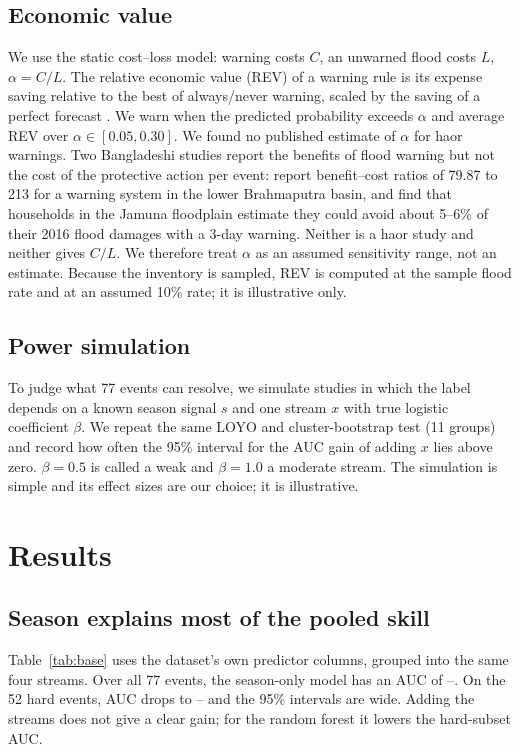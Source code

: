\subsection{Economic value}
We use the static cost--loss model: warning costs $C$, an unwarned flood costs $L$, $\alpha=C/L$. The relative economic value (REV) of a warning rule is its expense saving relative to the best of always/never warning, scaled by the saving of a perfect forecast \cite{richardson2000}. We warn when the predicted probability exceeds $\alpha$ and average REV over $\alpha\in[0.05,0.30]$. We found no published estimate of $\alpha$ for haor warnings. Two Bangladeshi studies report the benefits of flood warning but not the cost of the protective action per event: \cite{islam2024} report benefit--cost ratios of 79.87 to 213 for a warning system in the lower Brahmaputra basin, and \cite{zayed2025} find that households in the Jamuna floodplain estimate they could avoid about 5--6\% of their 2016 flood damages with a 3-day warning. Neither is a haor study and neither gives $C/L$. We therefore treat $\alpha$ as an assumed sensitivity range, not an estimate. Because the inventory is sampled, REV is computed at the sample flood rate and at an assumed 10\% rate; it is illustrative only.

\subsection{Power simulation}
To judge what 77 events can resolve, we simulate studies in which the label depends on a known season signal $s$ and one stream $x$ with true logistic coefficient $\beta$. We repeat the same LOYO and cluster-bootstrap test (11 groups) and record how often the 95\% interval for the AUC gain of adding $x$ lies above zero. $\beta=0.5$ is called a weak and $\beta=1.0$ a moderate stream. The simulation is simple and its effect sizes are our choice; it is illustrative.

\section{Results}
\subsection{Season explains most of the pooled skill}
Table~\ref{tab:base} uses the dataset's own predictor columns, grouped into the same four streams. Over all 77 events, the season-only model has an AUC of \seasonAUCallLo--\seasonAUCallHi. On the 52 hard events, AUC drops to \seasonAUChardLo--\seasonAUChardHi{} and the 95\% intervals are wide. Adding the streams does not give a clear gain; for the random forest it lowers the hard-subset AUC.

